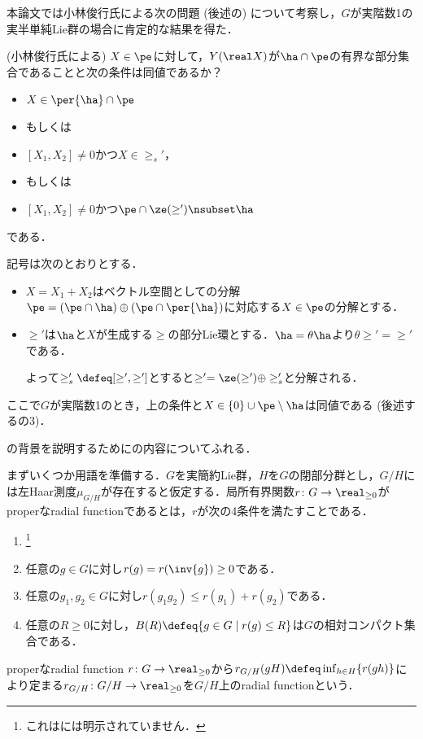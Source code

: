 本論文では小林俊行氏による次の問題 (後述の) について考察し，$G$が実階数1の実半単純Lie群の場合に肯定的な結果を得た．
\begin{prob*}(小林俊行氏による)
  $X\in  \pe$に対して，$Y(\real X)$が$ \ha\cap \pe$の有界な部分集合であることと次の条件は同値であるか？
  \begin{cond*}
    \leavevmode\vspace{-1em}
    \begin{itemize}
    \item $X\in \per{\ha}\cap\pe $
    \item[] もしくは
    \item $[X_1, X_2] \neq 0 $かつ$X\in \ge_{s}' $，
    \item[] もしくは
    \item $[X_1, X_2] \neq 0 $かつ$\pe\cap \ze(\ge') \nsubset \ha  $
    \end{itemize}
    である．
  \end{cond*}

  記号は次のとおりとする．
  \begin{itemize}
  \item $X = X_1 + X_2 $はベクトル空間としての分解$\pe =(\pe\cap \ha)\oplus(\pe\cap\per{\ha}) $に対応する$X\in \pe$の分解とする．
  \item $\ge ' $は$\ha$と$X$が生成する$\ge$の部分Lie環とする．$\ha = \theta \ha$より$\theta \ge' = \ge'$である．

    よって$\ge'_{s} \defeq [\ge',\ge'] $とすると$\ge' = \ze(\ge') \oplus \ge'_{s} $と分解される．
  \end{itemize}
\end{prob*}

ここで$G$が実階数1のとき，上の条件と$X\in \{0\}\cup\pe\setminus\ha $は同値である (後述するの3)．



の背景を説明するために\cite{ber88}の内容についてふれる．

まずいくつか用語を準備する．$G$を実簡約Lie群，$H$を$G$の閉部分群とし，$G/H$には左Haar測度$\mu_{G/H} $が存在すると仮定する．局所有界関数$r\colon G\to \real_{\geq 0} $がproperなradial functionであるとは，$r$が次の4条件を満たすことである．
\begin{enumerate}
\item {}\footnote{これは\cite{ber88}には明示されていません．}
\item 任意の$g\in G$に対し$r(g) = r(\inv{g})\geq 0  $である．
\item 任意の$g_1,g_2\in G$に対し$r(g_1g_2)\leq r(g_1) + r(g_2)  $である．
\item 任意の$R\geq 0$に対し，$B(R)\defeq \{g\in G\mid r(g)\leq R \} $は$G$の相対コンパクト集合である．
\end{enumerate}
properなradial function $r\colon G\to \real_{\geq 0} $から$r_{G/H}(gH)\defeq \inf_{h\in H}\{r(gh) \}$により定まる${r_{G/H}\colon G/H\to \real_{\geq 0}}$を$G/H$上のradial functionという．

